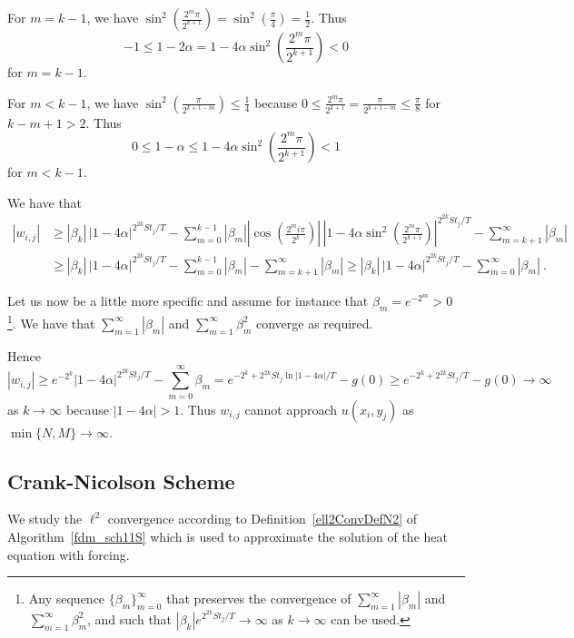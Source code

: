 \begin{egg}
For $m = k - 1$, we have
$\displaystyle \sin^2\left(\frac{2^m\pi}{2^{k+1}} \right)
= \sin^2\left(\frac{\pi}{4}\right) = \frac{1}{2}$.  Thus
\[
  -1 \leq 1 - 2\alpha = 1 - 4\alpha \sin^2\left(\frac{2^m\pi}{2^{k+1}}
  \right) <  0
\]
for $m = k -1$.

For $m < k - 1$, we have
$\displaystyle \sin^2\left(\frac{\pi}{2^{k+1-m}} \right) \leq \frac{1}{4}$
because
$\displaystyle 0 \leq \frac{2^m\pi}{2^{k+1}} = \frac{\pi}{2^{k+1-m}}
\leq \frac{\pi}{8}$
for $k-m +1 > 2$.  Thus
\[
  0 \leq 1 - \alpha \leq 1 - 4\alpha \sin^2\left(\frac{2^m\pi}{2^{k+1}}
  \right) <  1
\]
for $m < k-1$.

We have that
\begin{align*}
\left|w_{i,j}\right|
&\geq |\beta_k|\, \left|1 - 4\alpha \right|^{2^{2k} S t_j/T}
- \sum_{m=0}^{k-1} |\beta_m|
\left| \cos\left( \frac{ 2^m i \pi}{2^k}\right) \right|
\, \left|1 - 4\alpha \sin^2\left( \frac{2^m\pi}{2^{k+1}} \right)
\right|^{2^{2k} S t_j/T}
- \sum_{m=k+1}^\infty |\beta_m| \\
&\geq |\beta_k|\, \left|1 - 4\alpha \right|^{2^{2k} S t_j/T}
- \sum_{m=0}^{k-1} |\beta_m| - \sum_{m=k+1}^\infty |\beta_m|
\geq |\beta_k|\, \left|1 - 4\alpha \right|^{2^{2k} S t_j/T}
- \sum_{m=0}^\infty |\beta_m| \ .
\end{align*}

Let us now be a little more specific and assume for instance that
$\beta_m = e^{-2^m} >0$ \footnote{Any sequence
$\displaystyle \{\beta_m\}_{m=0}^\infty$ that preserves the convergence of
$\displaystyle \sum_{m=1}^\infty|\beta_m|$ and
$\displaystyle \sum_{m=1}^\infty\beta_m^2$, and such that
$|\beta_k| e^{2^{2k} S t_j/T} \to \infty$ as $k \to \infty$ can be
used.}.  We have that
$\displaystyle \sum_{m=1}^\infty|\beta_m|$ and
$\displaystyle \sum_{m=1}^\infty\beta_m^2$ converge as required.

Hence
\[
\left|w_{i,j}\right|
\geq  e^{-2^k} \left|1 - 4\alpha \right|^{2^{2k} S t_j/T}
- \sum_{m=0}^\infty \beta_m
= e^{-2^k + 2^{2k} S t_j \ln|1-4\alpha|/T} - g(0) 
\geq e^{-2^k + 2^{2k} S t_j/T} - g(0) 
\to \infty
\]
as $k\to \infty$ because $|1 - 4\alpha|>1$.  Thus $w_{i,j}$ cannot
approach $u(x_i,y_j)$ as $\min \{N,M\} \to \infty$.
\end{egg}

\subsection{Crank-Nicolson Scheme}

We study the $\ell^2$ convergence according to
Definition~\ref{ell2ConvDefN2} of Algorithm~\ref{fdm_sch11S} which is
used to approximate the solution of the heat equation with forcing.


